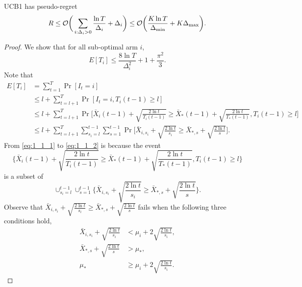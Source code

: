 \begin{thm}
    UCB1 has pseudo-regret
    \begin{equation}
        R \le \mathcal{O}\bigg(\sum_{i:\Delta_i>0} \frac{\ln T}{\Delta_i}+\Delta_i\bigg)
            \le \mathcal{O}\bigg(\frac{K\ln T}{\Delta_\text{min}}+K\Delta_\text{max}\bigg).
    \end{equation}
\end{thm}
\begin{proof}
    We show that for all sub-optimal arm $i$,
    \begin{equation}
        E[T_i] \le \frac{8\ln T}{\Delta_i^2} + 1 + \frac{\pi^2}{3}.
    \end{equation}
    Note that
    \begin{align}
        E[T_i]
            &= \sum_{t=1}^T \Pr[I_t=i] \\
            &\le l + \sum_{t=l+1}^T \Pr[I_t=i, T_i(t-1)\ge l] \\
            &\le l + \sum_{t=l+1}^T \Pr\Bigg[\bar X_{i}(t-1) +
                \sqrt{\frac{2\ln t}{T_i(t-1)}}\ge \bar X_{*}(t-1)+
                \sqrt{\frac{2\ln t}{T_{*}(t-1)}}, T_i(t-1)\ge l\Bigg] \label{eq:1_1_1}\\
            &\le l + \sum_{t=l+1}^T \sum_{s_i=l}^{t-1} \sum_{s=1}^{t-1}
                \Pr\Bigg[\bar X_{i,s_i} + \sqrt{\frac{2\ln t}{s_i}}\ge
                \bar X_{*,s}+\sqrt{\frac{2\ln t}{s}}\Bigg]. \label{eq:1_1_2}
    \end{align}
    From \eqref{eq:1_1_1} to \eqref{eq:1_1_2} is because the event
    \begin{equation}
        \Bigg\{\bar X_{i}(t-1) + \sqrt{\frac{2\ln t}{T_i(t-1)}}\ge
        \bar X_{*}(t-1)+\sqrt{\frac{2\ln t}{T_{*}(t-1)}}, T_i(t-1)\ge l\Bigg\}
    \end{equation}
    is a subset of
    \begin{equation}
        \cup_{s_i=l}^{t-1} \cup_{s=1}^{t-1}\Bigg\{\bar X_{i,s_i} + \sqrt{\frac{2\ln t}{s_i}}\ge
        \bar X_{*,s}+\sqrt{\frac{2\ln t}{s}}\Bigg\}.
    \end{equation}
    Observe that $\bar X_{i,s_i} + \sqrt{\frac{2\ln t}{s_i}}\ge\bar X_{*,s}+\sqrt{\frac{2\ln t}{s}}$
    fails when the following three conditions hold,
    \begin{align}
        \bar X_{i,s_i} + \sqrt{\frac{2\ln t}{s_i}} &< \mu_i + 2\sqrt{\frac{2\ln t}{s_i}}, \label{eq:1_2} \\
        \bar X_{*,s} + \sqrt{\frac{2\ln t}{s}} &> \mu_*,  \\
        \mu_* &\ge \mu_i + 2\sqrt{\frac{2\ln t}{s_i}}. \label{eq:1_3}

\end{align}
\end{proof}
